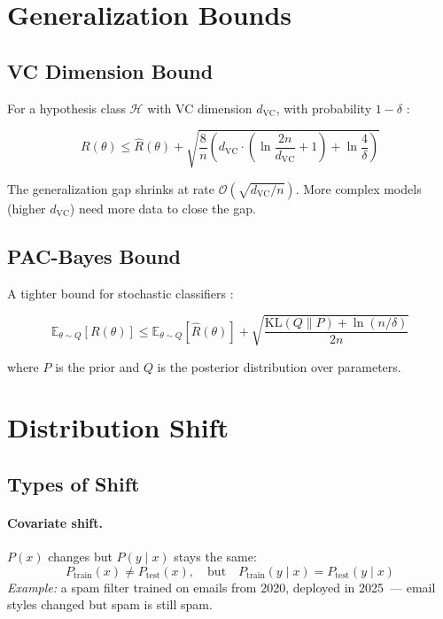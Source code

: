 \section{Generalization Bounds}

\subsection{VC Dimension Bound}

For a hypothesis class $\mathcal{H}$ with VC dimension $d_{\mathrm{VC}}$, with probability $1 - \delta$ \autocite{vapnikchervonenkis1971uniform}:

\[
R(\theta) \leq \hat{R}(\theta) + \sqrt{\frac{8}{n}\!\left(d_{\mathrm{VC}} \cdot \left(\ln\frac{2n}{d_{\mathrm{VC}}} + 1\right) + \ln\frac{4}{\delta}\right)}
\]

The generalization gap shrinks at rate $\mathcal{O}\!\left(\sqrt{d_{\mathrm{VC}}/n}\right)$. More complex models (higher $d_{\mathrm{VC}}$) need more data to close the gap.

\subsection{PAC-Bayes Bound}

A tighter bound for stochastic classifiers \autocite{mcallester1999pacbayes}:

\[
\mathbb{E}_{\theta \sim Q}[R(\theta)] \leq \mathbb{E}_{\theta \sim Q}[\hat{R}(\theta)] + \sqrt{\frac{\mathrm{KL}(Q \| P) + \ln(n/\delta)}{2n}}
\]

where $P$ is the prior and $Q$ is the posterior distribution over parameters.

\section{Distribution Shift}

\subsection{Types of Shift}

\paragraph{Covariate shift.} $P(x)$ changes but $P(y \mid x)$ stays the same:
\[
P_{\mathrm{train}}(x) \neq P_{\mathrm{test}}(x), \quad \text{but} \quad P_{\mathrm{train}}(y \mid x) = P_{\mathrm{test}}(y \mid x)
\]
\textit{Example:} a spam filter trained on emails from 2020, deployed in 2025~--- email styles changed but spam is still spam.

